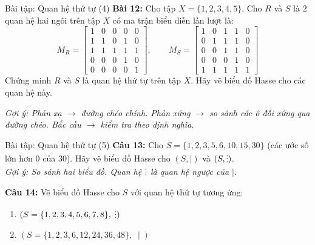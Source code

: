 \documentclass[12pt,a4paper]{article}
\newcommand{\chiahet}{\mathrel{\raisebox{-0.15ex}{\scalebox{0.85}{$\vdots$}}}}
\begin{document}
\begin{baitap}{Bài tập: Quan hệ thứ tự (4)}
\textbf{Bài 12:} Cho tập $X = \{1, 2, 3, 4, 5\}$. Cho $R$ và $S$ là $2$ quan hệ hai ngôi trên tập $X$ có ma trận biểu diễn lần lượt là:
\[
  M_R = \begin{bmatrix}
    1 & 0 & 0 & 0 & 0 \\
    1 & 1 & 0 & 1 & 0 \\
    1 & 1 & 1 & 1 & 1 \\
    0 & 0 & 0 & 1 & 0 \\
    0 & 0 & 0 & 0 & 1
  \end{bmatrix}, \qquad
  M_S = \begin{bmatrix}
    1 & 0 & 1 & 1 & 0 \\
    0 & 1 & 1 & 1 & 0 \\
    0 & 0 & 1 & 1 & 0 \\
    0 & 0 & 0 & 1 & 0 \\
    1 & 1 & 1 & 1 & 1
  \end{bmatrix}
\]
Chứng minh $R$ và $S$ là quan hệ thứ tự trên tập $X$. Hãy vẽ biểu đồ Hasse cho các quan hệ này.

\textit{Gợi ý: Phản xạ $\to$ đường chéo chính. Phản xứng $\to$ so sánh các ô đối xứng qua đường chéo. Bắc cầu $\to$ kiểm tra theo định nghĩa.}
\end{baitap}

\begin{baitap}{Bài tập: Quan hệ thứ tự (5)}
\textbf{Câu 13:} Cho $S = \{1, 2, 3, 5, 6, 10, 15, 30\}$ (các ước số lớn hơn $0$ của $30$). Hãy vẽ biểu đồ Hasse cho $(S, \mid)$ và $(S, \chiahet)$.\\
\textit{Gợi ý: So sánh hai biểu đồ. Quan hệ $\chiahet$ là quan hệ ngược của $\mid$.}

\textbf{Câu 14:} Vẽ biểu đồ Hasse cho $S$ với quan hệ thứ tự tương ứng:
\begin{enumerate}[label=\alph*)]
  \item $(S = \{1, 2, 3, 4, 5, 6, 7, 8\},\; \chiahet)$
  \item $(S = \{1, 2, 3, 6, 12, 24, 36, 48\},\; \mid)$
\end{enumerate}
\end{baitap}
\end{document}
